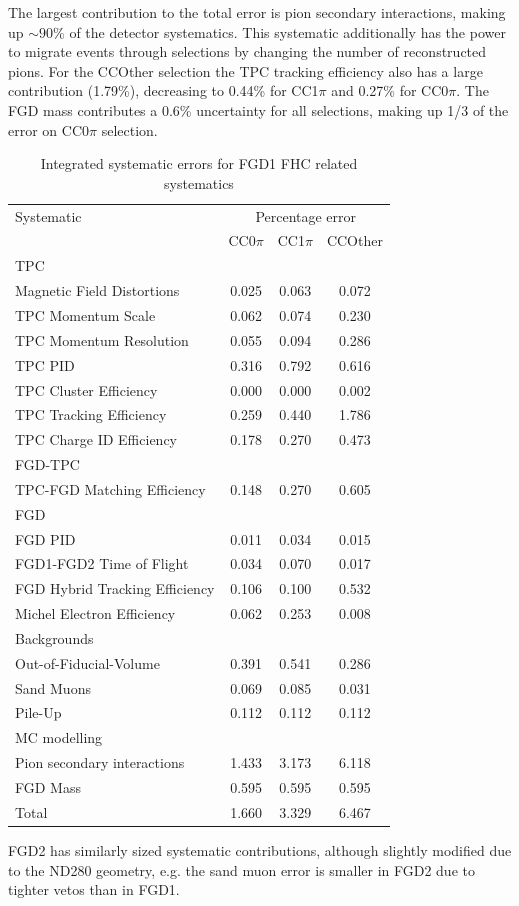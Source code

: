 The largest contribution to the total error is pion secondary interactions, making up $\sim90\%$ of the detector systematics. This systematic additionally has the power to migrate events through selections by changing the number of reconstructed pions. For the CCOther selection the TPC tracking efficiency also has a large contribution (1.79\%), decreasing to 0.44\% for CC1$\pi$ and 0.27\% for CC0$\pi$. The FGD mass contributes a 0.6\% uncertainty for all selections, making up 1/3 of the error on CC0$\pi$ selection.
\begin{table}[h]
	\begin{tabular}{l | c c c}
		\hline
		\hline
		Systematic & \multicolumn{3}{c}{Percentage error} \\
				   & CC0$\pi$ & CC1$\pi$ & CCOther \\ 
		\hline	
		\multicolumn{4}{l}{TPC} \\
		Magnetic Field Distortions		& 0.025 & 0.063 & 0.072 \\
		TPC Momentum Scale				& 0.062 & 0.074 & 0.230 \\
		TPC Momentum Resolution			& 0.055 & 0.094 & 0.286 \\
		TPC PID							& 0.316 & 0.792 & 0.616 \\
		TPC Cluster Efficiency			& 0.000 & 0.000 & 0.002 \\
		TPC Tracking Efficiency			& 0.259 & 0.440 & 1.786 \\
		TPC Charge ID Efficiency		& 0.178 & 0.270 & 0.473 \\
		\hline 
		\multicolumn{4}{l}{FGD-TPC} \\
		TPC-FGD Matching Efficiency		& 0.148 & 0.270 & 0.605 \\
		\hline
		\multicolumn{4}{l}{FGD} \\
		FGD PID							& 0.011 & 0.034 & 0.015 \\
		FGD1-FGD2 Time of Flight		& 0.034 & 0.070 & 0.017 \\
		FGD Hybrid Tracking Efficiency	& 0.106 & 0.100 & 0.532 \\
		Michel Electron Efficiency		& 0.062 & 0.253 & 0.008 \\
		\hline
		\multicolumn{4}{l}{Backgrounds} \\
		Out-of-Fiducial-Volume			& 0.391 & 0.541 & 0.286 \\
		Sand Muons						& 0.069 & 0.085 & 0.031 \\
		Pile-Up							& 0.112 & 0.112 & 0.112 \\
		\hline
		\multicolumn{4}{l}{MC modelling} \\
		Pion secondary interactions		& 1.433 & 3.173 & 6.118 \\
		FGD Mass						& 0.595 & 0.595 & 0.595 \\
		\hline
		Total & 1.660 & 3.329 & 6.467 \\
		\hline
		\hline
	\end{tabular}
\caption{Integrated systematic errors for FGD1 FHC related systematics}
\label{tab:nd280_syst_error_nu}
\end{table}
FGD2 has similarly sized systematic contributions, although slightly modified due to the ND280 geometry, e.g. the sand muon error is smaller in FGD2 due to tighter vetos than in FGD1.

